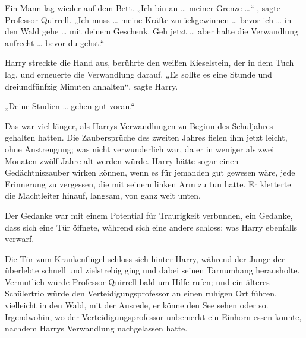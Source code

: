 Ein Mann lag wieder auf dem Bett.
„Ich bin an … meiner Grenze …“ , sagte Professor Quirrell.
„Ich muss … meine Kräfte zurückgewinnen … bevor ich … in den Wald gehe … mit deinem Geschenk. Geh jetzt … aber halte die Verwandlung aufrecht … bevor du gehst.“

Harry streckte die Hand aus, berührte den weißen Kieselstein, der in dem Tuch lag, und erneuerte die Verwandlung darauf.
„Es sollte es eine Stunde und dreiundfünfzig Minuten anhalten“, sagte Harry.

„Deine Studien … gehen gut voran.“

Das war viel länger, als Harrys Verwandlungen zu Beginn des Schuljahres gehalten hatten. Die Zaubersprüche des zweiten Jahres fielen ihm jetzt leicht, ohne Anstrengung; was nicht verwunderlich war, da er in weniger als zwei Monaten zwölf Jahre alt werden würde. Harry hätte sogar einen Gedächtniszauber wirken können, wenn es für jemanden gut gewesen wäre, jede Erinnerung zu vergessen, die mit seinem linken Arm zu tun hatte. Er kletterte die Machtleiter hinauf, langsam, von ganz weit unten.

Der Gedanke war mit einem Potential für Traurigkeit verbunden, ein Gedanke, dass sich eine Tür öffnete, während sich eine andere schloss; was Harry ebenfalls verwarf.

\later

Die Tür zum Krankenflügel schloss sich hinter Harry, während der Junge-der-überlebte schnell und zielstrebig ging und dabei seinen Tarnumhang herausholte. Vermutlich würde Professor Quirrell bald um Hilfe rufen; und ein älteres Schülertrio würde den Verteidigungsprofessor an einen ruhigen Ort führen, vielleicht in den Wald, mit der Ausrede, er könne den See sehen oder so. Irgendwohin, wo der Verteidigungsprofessor unbemerkt ein Einhorn essen konnte, nachdem Harrys Verwandlung nachgelassen hatte.

